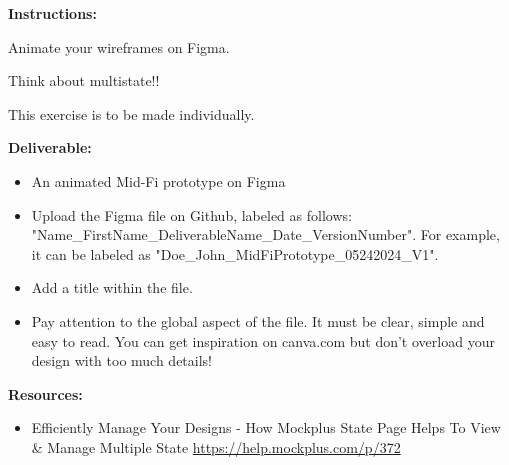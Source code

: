 \makeheaderfiles

\textbf{Instructions:}

Animate your wireframes on Figma.

Think about multistate!!

This exercise is to be made individually.

\textbf{Deliverable:}

\begin{itemize}
\item An animated Mid-Fi prototype on Figma
\item Upload the Figma file on Github, labeled as follows: "Name\_FirstName\_DeliverableName\_Date\_VersionNumber". For example, it can be labeled as "Doe\_John\_MidFiPrototype\_05242024\_V1".
\item Add a title within the file.
\item Pay attention to the global aspect of the file. It must be clear, simple and easy to read. You can get inspiration on canva.com but don't overload your design with too much details!
\end{itemize}

\textbf{Resources:}

\begin{itemize}
\item Efficiently Manage Your Designs - How Mockplus State Page Helps To View \& Manage Multiple State \url{https://help.mockplus.com/p/372}
\end{itemize}

